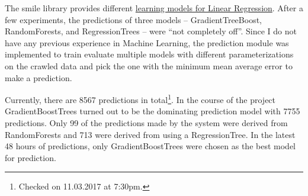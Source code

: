 The smile library provides different \href{http://haifengl.github.io/smile/index.html}{learning models for Linear Regression}. After a few experiments, the predictions of three models -- GradientTreeBoost, RandomForests, and RegressionTrees -- were ``not completely off''. Since I do not have 
any previous experience in Machine Learning, the prediction module was implemented to train evaluate multiple models 
with different parameterizations on the crawled data and pick the one with the minimum mean average error to make a 
prediction.  

Currently, there are 8567 predictions in total\footnote{Checked on 11.03.2017 at 7:30pm.}. In the course of the 
project GradientBoostTrees turned out to be the dominating prediction model with 7755 predictions. Only 99 of the 
predictions made by the system were derived from RandomForests and 713 were derived from using a RegressionTree. In the latest 48 hours of predictions, only GradientBoostTrees were chosen as the best model for prediction. 